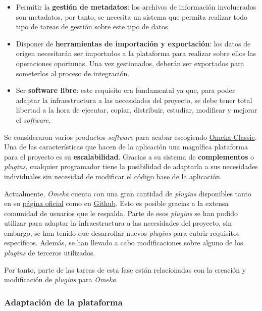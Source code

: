 \documentclass[
]{article}
\providecommand{\tightlist}{%
  \setlength{\itemsep}{0pt}\setlength{\parskip}{0pt}}
\begin{document}
\begin{itemize}
\tightlist
\item
  Permitir la \textbf{gestión de metadatos}: los archivos de información
  involucrados son metadatos, por tanto, se necesita un sistema que
  permita realizar todo tipo de tareas de gestión sobre este tipo de
  datos.
\item
  Disponer de \textbf{herramientas de importación y exportación}: los
  datos de origen necesitarán ser importados a la plataforma para
  realizar sobre ellos las operaciones oportunas. Una vez gestionados,
  deberán ser exportados para someterlos al proceso de integración.
\item
  Ser \textbf{software libre}: este requisito era fundamental ya que,
  para poder adaptar la infraestructura a las necesidades del proyecto,
  se debe tener total libertad a la hora de ejecutar, copiar,
  distribuir, estudiar, modificar y mejorar el \emph{software}.
\end{itemize}

Se consideraron varios productos \emph{software} para acabar escogiendo
\href{https://omeka.org/classic/}{Omeka Classic}. Una de las
características que hacen de la aplicación una magnífica plataforma para
el proyecto es su \textbf{escalabilidad}. Gracias a su sistema de
\textbf{complementos} o \emph{plugins}, cualquier programador tiene la
posibilidad de adaptarla a sus necesidades individuales sin necesidad de
modificar el código base de la aplicación.

Actualmente, \emph{Omeka} cuenta con una gran cantidad de \emph{plugins}
disponibles tanto en su \href{https://omeka.org/classic/plugins/}{página
oficial} como en
\href{https://daniel-km.github.io/UpgradeToOmekaS/omeka_plugins.html}{Github}.
Esto es posible gracias a la extensa comunidad de usuarios que le
respalda. Parte de esos \emph{plugins} se han podido utilizar para
adaptar la infraestructura a las necesidades del proyecto, sin embargo,
se han tenido que desarrollar nuevos \emph{plugins} para cubrir
requisitos específicos. Además, se han llevado a cabo modificaciones
sobre alguno de los \emph{plugins} de terceros utilizados.

Por tanto, parte de las tareas de esta fase están relacionadas con la
creación y modificación de \emph{plugins} para \emph{Omeka}.

\hypertarget{adaptaciuxf3n-de-la-plataforma}{%
\subsubsection{Adaptación de la
plataforma}\label{adaptaciuxf3n-de-la-plataforma}}
\end{document}
